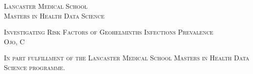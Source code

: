 
\begin{titlepage}

        \begin{center}

            \vspace*{1cm}

            \begin{minipage}{0.95\textwidth}

                \begin{center}
                    {\sffamily \small \textsc{Lancaster Medical School\\Masters in Health Data Science}}
                    \vspace{3.5cm}

                    {\sffamily \large \textsc{Investigating Risk Factors of Geohelminths Infections Prevalence}\\
                    \small \textsc{Ojo, C}}
                    \vspace{11.5cm}

                    {\sffamily \small \textsc{In part fulfillment of the Lancaster Medical School Masters in Health Data Science programme.}}

                \end{center}

            \end{minipage}

        \end{center}

\end{titlepage}